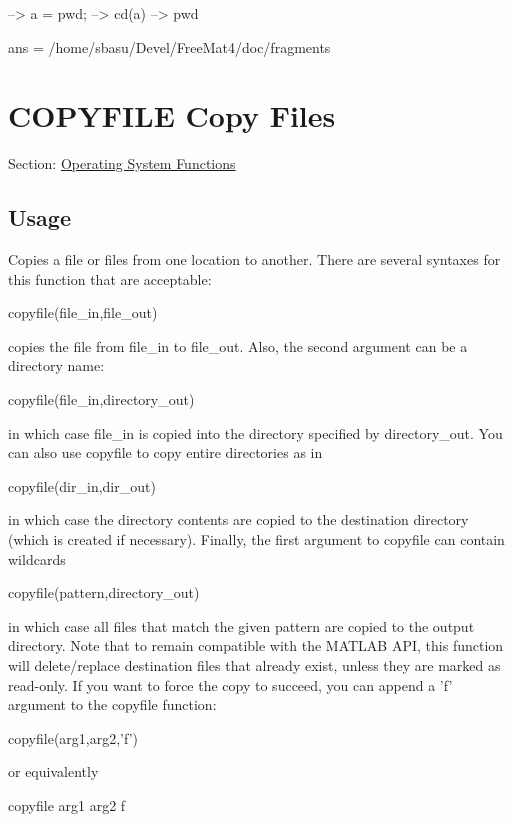 \begin{DoxyVerbInclude}
--> a = pwd;
--> cd(a)
--> pwd

ans = 
/home/sbasu/Devel/FreeMat4/doc/fragments
\end{DoxyVerbInclude}
 \hypertarget{os_copyfile}{}\section{C\-O\-P\-Y\-F\-I\-L\-E Copy Files}\label{os_copyfile}
Section\-: \hyperlink{sec_os}{Operating System Functions} \hypertarget{vtkwidgets_vtkxyplotwidget_Usage}{}\subsection{Usage}\label{vtkwidgets_vtkxyplotwidget_Usage}
Copies a file or files from one location to another. There are several syntaxes for this function that are acceptable\-: \begin{DoxyVerb}   copyfile(file_in,file_out)
\end{DoxyVerb}
 copies the file from {\ttfamily file\-\_\-in} to {\ttfamily file\-\_\-out}. Also, the second argument can be a directory name\-: \begin{DoxyVerb}   copyfile(file_in,directory_out)
\end{DoxyVerb}
 in which case {\ttfamily file\-\_\-in} is copied into the directory specified by {\ttfamily directory\-\_\-out}. You can also use {\ttfamily copyfile} to copy entire directories as in \begin{DoxyVerb}   copyfile(dir_in,dir_out)
\end{DoxyVerb}
 in which case the directory contents are copied to the destination directory (which is created if necessary). Finally, the first argument to {\ttfamily copyfile} can contain wildcards \begin{DoxyVerb}   copyfile(pattern,directory_out)
\end{DoxyVerb}
 in which case all files that match the given pattern are copied to the output directory. Note that to remain compatible with the M\-A\-T\-L\-A\-B A\-P\-I, this function will delete/replace destination files that already exist, unless they are marked as read-\/only. If you want to force the copy to succeed, you can append a {\ttfamily 'f'} argument to the {\ttfamily copyfile} function\-: \begin{DoxyVerb}   copyfile(arg1,arg2,'f')
\end{DoxyVerb}
 or equivalently \begin{DoxyVerb}   copyfile arg1 arg2 f
\end{DoxyVerb}
